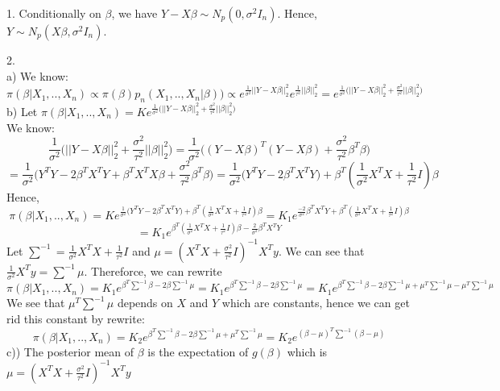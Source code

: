 \documentclass[10pt]{article}
\newenvironment{problem}[2][Problem]{\begin{trivlist}
\item[\hskip \labelsep {\bfseries #1}\hskip \labelsep {\bfseries #2.}]}{\end{trivlist}}
\begin{document}
\begin{problem}{2}
\item 1. Conditionally on $\beta$, we have $Y-X\beta \sim N_p(0, \sigma^2 I_n)$. Hence, $Y \sim N_p(X\beta, \sigma^2 I_n)$.
\item 2.\\
a) We know:
\[ \pi(\beta| X_1,..,X_n) \propto  \pi(\beta) p_n(X_1,..,X_n|\beta)) \propto e^{\frac{1}{\sigma^2} ||Y - X\beta||_2^{2}} e^{\frac{1}{\tau^2}||\beta||_2^2} = e^{\frac{1}{\sigma^2} \Big ( ||Y - X\beta||_2^{2} + \frac{\sigma^2}{\tau^2} ||\beta||_2^2 \Big ) } \]
b) Let $\pi(\beta| X_1,..,X_n) = Ke^{\frac{1}{\sigma^2} \Big ( ||Y - X\beta||_2^{2} + \frac{\sigma^2}{\tau^2} ||\beta||_2^2 \Big ) } $\\
We know: 
\[\frac{1}{\sigma^2} \Big ( ||Y - X\beta||_2^{2} + \frac{\sigma^2}{\tau^2} ||\beta||_2^2 \Big ) = \frac{1}{\sigma^2}\Big ( (Y - X\beta)^{T}(Y - X\beta)  + \frac{\sigma^2}{\tau^2} \beta^{T}\beta \Big )\]
\[ = \frac{1}{\sigma^2}\Big ( Y^{T}Y - 2\beta^{T}X^{T}Y + \beta^{T}X^{T}X\beta  + \frac{\sigma^2}{\tau^2} \beta^{T}\beta \Big ) =  \frac{1}{\sigma^2}\Big ( Y^{T}Y - 2\beta^{T}X^{T}Y \Big )+ \beta^{T}(\frac{1}{\sigma^2} X^{T}X + \frac{1}{\tau^2} I)\beta \]
Hence, 
\[ \pi(\beta| X_1,..,X_n) = Ke^{\frac{1}{\sigma^2}\Big ( Y^{T}Y - 2\beta^{T}X^{T}Y\Big ) + \beta^{T}(\frac{1}{\sigma^2} X^{T}X + \frac{1}{\tau^2} I)\beta} = K_1e^{\frac{-2}{\sigma^2}\beta^{T}X^{T}Y + \beta^{T}(\frac{1}{\sigma^2} X^{T}X + \frac{1}{\tau^2} I)\beta }\]
\[= K_1e^{ \beta^{T}(\frac{1}{\sigma^2} X^{T}X + \frac{1}{\tau^2} I)\beta -\frac{2}{\sigma^2}\beta^{T}X^{T}Y   }\]
Let $\sum^{-1} = \frac{1}{\sigma^2} X^{T}X + \frac{1}{\tau^2} I$ and $\mu = (X^{T}X + \frac{\sigma^2}{\tau^2} I)^{-1}X^{T}y$. We can see that $\frac{1}{\sigma^2} X^{T}y = \sum^{-1}\mu$. Thereforce, we can rewrite
\[ \pi(\beta| X_1,..,X_n) =  K_1 e^{\beta^T \sum^{-1} \beta - 2\beta \sum^{-1}\mu } = K_1 e^{\beta^T \sum^{-1} \beta - 2\beta \sum^{-1}\mu }= K_1 e^{\beta^T \sum^{-1} \beta - 2\beta \sum^{-1}\mu + \mu^T\sum^{-1}\mu - \mu^T\sum^{-1}\mu}\]
We see that $ \mu^T\sum^{-1}\mu$ depends on $X$ and $Y$ which are constants, hence we can get rid this constant by rewrite:
\[\pi(\beta| X_1,..,X_n) = K_2 e^{\beta^T \sum^{-1} \beta - 2\beta \sum^{-1}\mu + \mu^T\sum^{-1}\mu} = K_2e^{(\beta - \mu)^{T}\sum^{-1}(\beta - \mu)}\]
c)) The posterior mean of $\beta$ is the expectation of $g(\beta)$ which is $\mu = (X^{T}X + \frac{\sigma^2}{\tau^2} I)^{-1}X^{T}y$



\end{problem}
\begin{problem}{3}


\end{problem}
\end{document}
